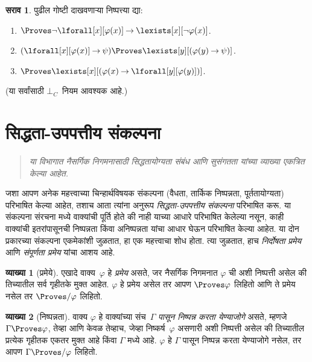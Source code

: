 \documentclass[11pt,a4paper,openany]{book}
\theoremstyle{definition}
\newtheorem{defn}{व्याख्या}[section]
\newtheorem{prob}{सराव}[chapter]
\newenvironment{explain}{}{}
\newcommand{\lif}{\mathbin{\to}}
\newenvironment{editorial}{\begin{quote}\small\itshape}{\end{quote}}
\newcommand{\lfalse}{\bot}
\newcommand{\FalseCl}{\ensuremath{\lfalse_C}}
\begin{document}
\begin{prob}
पुढील गोष्टी दाखवणाऱ्या निष्पत्त्या द्या:
\begin{enumerate}
\item $\Proves \lnot\lforall[x][\varphi(x)] \lif \lexists[x][\lnot\varphi(x)]$.
\item $(\lforall[x][\varphi(x)] \lif \psi) \Proves \lexists[y][(\varphi(y) \lif \psi)]$.
\item $\Proves \lexists[x][(\varphi(x) \lif \lforall[y][\varphi(y)])]$.
\end{enumerate}
(या सर्वांसाठी $\FalseCl$~नियम आवश्यक आहे.)
\end{prob}









\section{सिद्धता-उपपत्तीय संकल्पना}\label{fol:ntd:ptn:sec}

\begin{editorial}
या विभागात नैसर्गिक निगमनासाठी सिद्धतायोग्यता संबंध आणि सुसंगतता यांच्या
व्याख्या एकत्रित केल्या आहेत.
\end{editorial}

\begin{explain}
जशा आपण अनेक महत्त्वाच्या चिन्हार्थविषयक संकल्पना (वैधता, तार्किक निष्पन्नता,
पूर्ततायोग्यता) परिभाषित केल्या आहेत, तशाच आता त्यांना अनुरूप
\emph{सिद्धता-उपपत्तीय संकल्पना} परिभाषित करू. या संकल्पना संरचना मध्ये
वाक्यांची पूर्ति होते की नाही याच्या आधारे परिभाषित केलेल्या नसून,
काही वाक्यांची इतरांपासूनची निष्पन्नता किंवा
अनिष्पन्नता यांचा आधार घेऊन परिभाषित केल्या आहेत. या दोन प्रकारच्या
संकल्पना एकमेकांशी जुळतात, हा एक महत्त्वाचा शोध होता. त्या जुळतात, हाच
\emph{निर्दोषता प्रमेय} आणि \emph{संपूर्णता प्रमेय} यांचा आशय आहे.
\end{explain}


\begin{defn}[प्रमेये]
एखादे वाक्य~$\varphi$ हे \emph{प्रमेय} असते, जर नैसर्गिक निगमनात $\varphi$ ची
अशी निष्पत्ती असेल की तिच्यातील सर्व गृहीतके मुक्त आहेत.
$\varphi$ हे प्रमेय असेल तर आपण $\Proves \varphi$ लिहितो आणि ते प्रमेय नसेल तर
$\Proves/ \varphi$ लिहितो.
\end{defn}

\begin{defn}[निष्पन्नता]
वाक्य $\varphi$ हे वाक्यांच्या संच~$\Gamma$ \emph{पासून
निष्पन्न करता येण्याजोगे} असते, म्हणजे $\Gamma \Proves \varphi$, तेव्हा आणि केवळ तेव्हाच,
जेव्हा निष्कर्ष~$\varphi$ असणारी अशी निष्पत्ती असेल की तिच्यातील प्रत्येक
गृहीतक एकतर मुक्त आहे किंवा $\Gamma$ मध्ये आहे. $\varphi$ हे $\Gamma$
पासून निष्पन्न करता येण्याजोगे नसेल, तर आपण $\Gamma \Proves/ \varphi$ लिहितो.
\end{defn}
\end{document}
